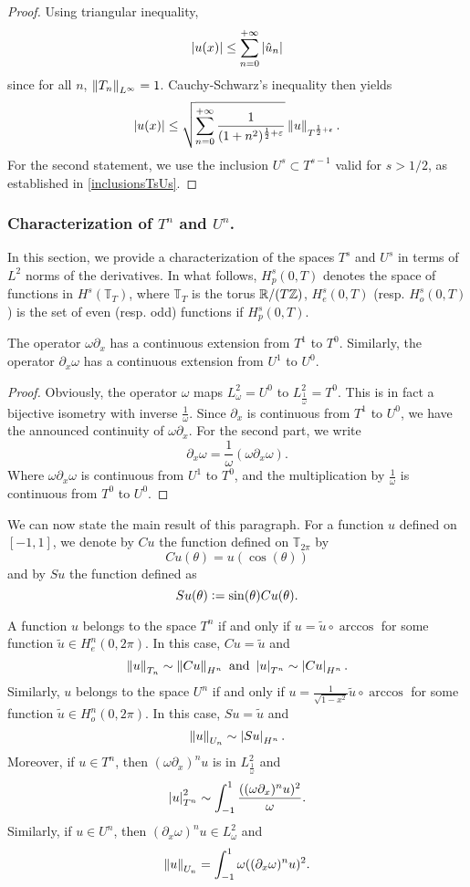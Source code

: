 \documentclass[a4paper]{article}
\begin{document}
\begin{proof}
	Using triangular inequality,
	\[\left\lvert u(x) \right\rvert \leq \sum_{n = 0}^{+ \infty} \left\lvert \hat{u}_n \right\rvert\]
	since for all $n$, $\left\|T_n\right\|_{L^\infty} = 1$. Cauchy-Schwarz's inequality then yields
	\[\left\lvert u(x) \right\rvert \leq \sqrt{\sum_{n= 0}^{+ \infty} \frac{1}{(1+ n^2)^{\frac{1}{2}+ \varepsilon}}} \left\|u\right\|_{T^{\frac{1}{2} + \varepsilon}}.\]
	For the second statement, we use the inclusion $U^{s} \subset T^{s-1}$ valid for $s > 1/2$, as established in \autoref{inclusionsTsUs}. 
\end{proof}	

\subsubsection{Characterization of $T^n$ and $U^n$.}
In this section, we provide a characterization of the spaces $T^s$ and $U^s$ in terms of $L^2$ norms of the derivatives. In what follows, $H^s_p(0,T)$ denotes the space of functions in $H^s(\mathbb{T}_{T})$, where $\mathbb{T}_T$ is the torus $\mathbb{R} / (T\mathbb{Z})$, $H^s_e(0,T)$ (resp. $H^s_o(0,T)$) is the set of even (resp. odd) functions if $H^s_p(0,T)$.
\begin{Lem}
	\label{omegadxetdxomga}
	The operator $\omega \partial_x$ has a continuous extension from $T^1$ to $T^0$. Similarly, the operator $\partial_x \omega$ has a continuous extension from $U^1$ to $U^0$. 
\end{Lem}
\begin{proof}
	Obviously, the operator $\omega$ maps $L^2_\omega = U^0$ to $L^2_\frac{1}{\omega} = T^0$. This is in fact a bijective isometry with inverse $\frac{1}{\omega}$.
	Since $\partial_x$ is continuous from $T^1$ to $U^0$, we have the announced continuity of $\omega \partial_x$.
	For the second part, we write 
	\[\partial_x \omega = \frac{1}{\omega} \left(\omega \partial_x \omega\right).\]
	Where $\omega \partial_x \omega$ is continuous from $U^1$ to $T^0$, and the multiplication by $\frac{1}{\omega}$ is continuous from $T^0$ to $U^0$. 
\end{proof}
We can now state the main result of this paragraph. For a function $u$ defined on $[-1,1]$, we denote by $Cu$ the function defined on $\mathbb{T}_{2\pi}$ by
\[ Cu(\theta) = u(\cos(\theta))\]
and by $Su$ the function defined as 
\[Su(\theta) \mathrel{\mathop:}= \sin(\theta) Cu(\theta).\]
\begin{Lem}
	A function $u$ belongs to the space $T^n$ if and only if $u = \tilde{u} \circ \arccos$ for some function $\tilde{u} \in H^n_e(0,2\pi)$. In this case, $Cu = \tilde{u}$ and
	\[ \left\|u\right\|_{T_n}\sim \left\|Cu\right\|_{H^n} \mbox{ and } \left\lvert u \right\rvert_{T^n} \sim \left\lvert Cu \right\rvert_{H^n}.\]
	Similarly, $u$ belongs to  the space $U^n$ if and only if $u = \frac{1}{\sqrt{1 - x^2}} \tilde{u}  \circ  \arccos$  for some function $\tilde{u} \in H^n_o(0,2\pi)$. In this case, $Su = \tilde{u}$ and
	\[\left\|u\right\|_{U_n} \sim \left\lvert Su \right\rvert_{H^n}.\]	
	Moreover, if $ u \in T^n$, then $(\omega \partial_x)^n u$ is in $L^2_\frac{1}{\omega}$ and 
	\[ \left\lvert u \right\rvert_{T^n}^2 \sim \int_{-1}^{1} \frac{((\omega \partial_x)^n u)^2}{\omega}.\]
	\noindent Similarly, if $u \in U^n$, then $(\partial_x \omega)^n u \in L^2_\omega$ and 
	\[ \left\|u\right\|_{U_n} = \int_{-1}^{1}\omega ((\partial_x \omega)^n u)^2.\]
	\label{thmChar}
\end{Lem}
\end{document}
